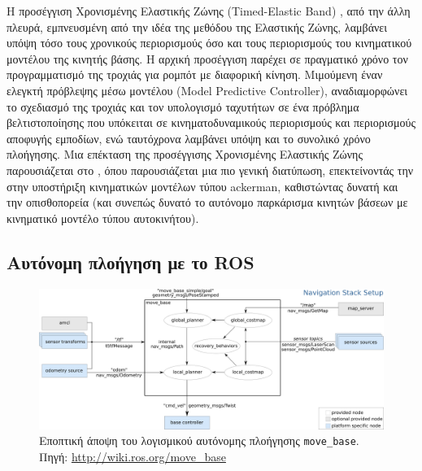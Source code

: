 Η προσέγγιση Χρονισμένης Ελαστικής Ζώνης (Timed-Elastic Band)
\cite{ChristophRoesmann}, από την άλλη πλευρά, εμπνευσμένη από την ιδέα της
μεθόδου της Ελαστικής Ζώνης, λαμβάνει υπόψη τόσο τους χρονικούς περιορισμούς
όσο και τους περιορισμούς του κινηματικού μοντέλου της κινητής βάσης. Η αρχική
προσέγγιση παρέχει σε πραγματικό χρόνο τον προγραμματισμό της τροχιάς για
ρομπότ με διαφορική κίνηση. Μιμούμενη έναν ελεγκτή πρόβλεψης μέσω μοντέλου
(Model Predictive Controller), αναδιαμορφώνει το σχεδιασμό της τροχιάς και τον
υπολογισμό ταχυτήτων σε ένα πρόβλημα βελτιστοποίησης που υπόκειται σε
κινηματοδυναμικούς περιορισμούς και περιορισμούς αποφυγής εμποδίων, ενώ
ταυτόχρονα λαμβάνει υπόψη και το συνολικό χρόνο πλοήγησης. Μια επέκταση της
προσέγγισης Χρονισμένης Ελαστικής Ζώνης παρουσιάζεται στο \cite{Rosmann2017},
όπου παρουσιάζεται μια πιο γενική διατύπωση, επεκτείνοντάς την στην υποστήριξη
κινηματικών μοντέλων τύπου ackerman, καθιστώντας δυνατή και την οπισθοπορεία
(και συνεπώς δυνατό το αυτόνομο παρκάρισμα κινητών βάσεων με κινηματικό μοντέλο
τύπου αυτοκινήτου).



\subsection{Αυτόνομη πλοήγηση με το ROS}
\label{subsection:02_01_02:03}

\begin{figure}\centering
  \includegraphics[width=\textwidth]{./figures/parts/01/chapters/03/sections/01/move_base.png}
  \caption{\small Εποπτική άποψη του λογισμικού αυτόνομης πλοήγησης
           \texttt{move\_base}. Πηγή: \url{http://wiki.ros.org/move\_base}}
  \label{fig:movebase}
\end{figure}

